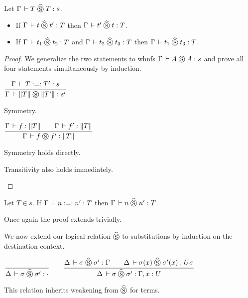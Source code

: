 \documentclass[a4paper,english]{lipics-utf8x}
\begin{document}
  \begin{lemma}
    \label{lem:s-per}
    Let $\Gamma \,\vdash T \mathrel{\widehat{\mathrel{\circledS}}} T : s$.
    \leavevmode
    \begin{itemize}
      \item If $\Gamma \,\vdash t \mathrel{\widehat{\mathrel{\circledS}}} t' : T$ then $\Gamma \,\vdash t' \mathrel{\widehat{\mathrel{\circledS}}} t : T$.
      \item If $\Gamma \,\vdash t_1 \mathrel{\widehat{\mathrel{\circledS}}} t_2 : T$ and $\Gamma \,\vdash t_2 \mathrel{\widehat{\mathrel{\circledS}}} t_3 : T$
      then $\Gamma \,\vdash t_1 \mathrel{\widehat{\mathrel{\circledS}}} t_3 : T$.
    \end{itemize}
  \end{lemma}

  \begin{proof}
    We generalize the two statements to whnfs $\Gamma \,\vdash A \mathrel{\circledS} A : s$ and
    prove all four statements simultaneously by induction.

    \begin{center}
    \(
      \ru{\Gamma \der T :=: T' : s
        }{\Gamma \der \squash{T} \Sr \squash{T'} : s'}
    \)
    \end{center}

    \begin{caselist}
      \nextcase Symmetry.
      \begin{center}
      \(
        \ru{\Gamma \der f : \squash{T} \qquad
            \Gamma \der f' : \squash{T}
          }{\Gamma \der f \Sr f' : \squash{T}}
      \)
      \end{center}
      Symmetry holds directly.

      \nextcase Transitivity also holds immediately.
    \end{caselist}
  \end{proof}

  \begin{lemma}
    Let $T \in s$.
    If $\Gamma \,\vdash n :=: n' : T$ then $\Gamma \,\vdash n \mathrel{\widehat{\mathrel{\circledS}}} n' : T$.
  \end{lemma}
  Once again the proof extends trivially.


  We now extend our logical relation $\mathrel{\widehat{\mathrel{\circledS}}}$ to substitutions by
  induction on the destination context.
  \begin{center}
  \(
    \ru{}{\Delta \der \sigma \hSr \sigma' : \cdot}
    \qquad
    \ru{\Delta \der \sigma \hSr \sigma' : \Gamma \qquad
        \Delta \der \sigma(x) \hSr \sigma'(x) : U \sigma
      }{\Delta \der \sigma \hSr \sigma' : \Gamma, x:U}
  \)
  \end{center}
  This relation inherits weakening from $\mathrel{\widehat{\mathrel{\circledS}}}$ for terms.
\end{document}
